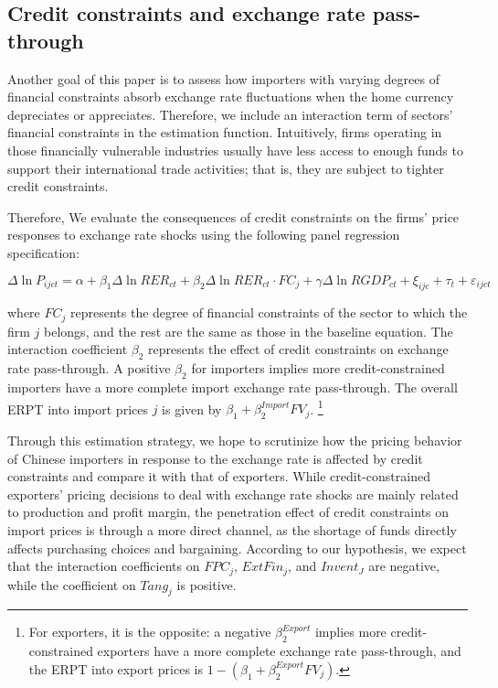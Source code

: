 \documentclass[12pt]{article}
\begin{document}
\subsection{Credit constraints and exchange rate pass-through} \label{Empirical-Credit}

Another goal of this paper is to assess how importers with varying degrees of financial constraints absorb exchange rate fluctuations when the home currency depreciates or appreciates. Therefore, we include an interaction term of sectors’ financial constraints in the estimation function. Intuitively, firms operating in those financially vulnerable industries usually have less access to enough funds to support their international trade activities; that is, they are subject to tighter credit constraints.

Therefore, We evaluate the consequences of credit constraints on the firms' price responses to exchange rate shocks using the following panel regression specification:

\begin{equation}
	\Delta \ln P_{ijct}=\alpha+\beta_{1} \Delta \ln RER_{ct}+\beta_{2} \Delta \ln RER_{ct} \cdot FC_{j}+\gamma \Delta \ln RGDP_{ct}+\xi_{ijc}+\tau_{t} +\varepsilon_{ijct}
	\label{eq.credit}
\end{equation}

where $FC_{j}$ represents the degree of financial constraints of the sector to which the firm $j$ belongs, and the rest are the same as those in the baseline equation. The interaction coefficient $\beta_2$ represents the effect of credit constraints on exchange rate pass-through. A positive $\beta_2$ for importers implies more credit-constrained importers have a more complete import exchange rate pass-through. The overall ERPT into import prices $j$ is given by $\beta_{1} +\beta^{Import}_{2} FV_j$. \footnote{For exporters, it is the opposite: a negative $\beta^{Export}_2$ implies more credit-constrained exporters have a more complete exchange rate pass-through, and the ERPT into export prices is $1-(\beta_{1} +\beta^{Export}_{2} FV_j)$.}

Through this estimation strategy, we hope to scrutinize how the pricing behavior of Chinese importers in response to the exchange rate is affected by credit constraints and compare it with that of exporters. While credit-constrained exporters’ pricing decisions to deal with exchange rate shocks are mainly related to production and profit margin, the penetration effect of credit constraints on import prices is through a more direct channel, as the shortage of funds directly affects purchasing choices and bargaining. According to our hypothesis, we expect that the interaction coefficients on $FPC_{j}$, $ExtFin_j$, and $Invent_J$ are negative, while the coefficient on $Tang_j$ is positive.
\end{document}
